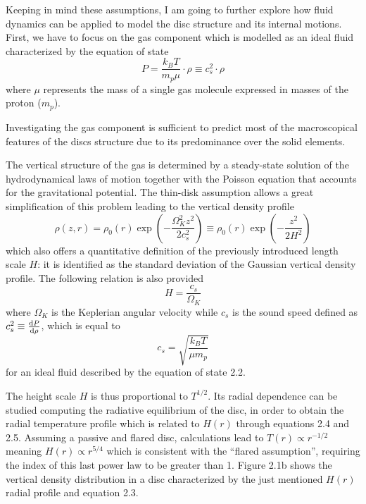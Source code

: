 \documentclass[a4paper,10pt]{report}
\begin{document}
Keeping in mind these assumptions, I am going to further explore how fluid dynamics can be applied to model the disc 
structure and its internal motions. First, we have to focus on the gas component which is modelled as an ideal fluid characterized
by the equation of state
\begin{equation}
    P = \frac{k_BT}{m_p\mu}\cdot \rho \equiv c_s^2 \cdot \rho
\end{equation}
where $\mu$ represents the mass of a single gas molecule expressed in masses of the proton ($m_p$).

Investigating the gas component is sufficient to predict most of the macroscopical features of the discs structure due to its
predominance over the solid elements. 

The vertical structure of the gas is determined by a steady-state solution of the hydrodynamical laws of motion together with the Poisson equation that
accounts for the gravitational potential. The thin-disk assumption allows a great simplification
 of this problem leading to the vertical density profile
\begin{equation}
    \rho(z, r) = \rho_0(r)\exp(-\frac{\Omega_K^2z^2}{2c_s^2}) \equiv \rho_0(r)\exp(-\frac{z^2}{2H^2})
\end{equation}
which also offers a quantitative definition of the previously introduced length scale
$H$: it is identified as the 
standard deviation of the Gaussian vertical density profile.
The following relation is also provided
\begin{equation}
    H = \frac{c_s}{\Omega_K}
\end{equation}
where $\Omega_K$ is the Keplerian 
angular velocity while $c_s$ is the sound speed defined as $c_s^2 \equiv \dv{P}{\rho}$, which is equal to 
\begin{equation}
    c_s = \sqrt{\frac{k_BT}{\mu m_p}}
\end{equation}
for an 
ideal fluid described by the equation of state 2.2.

The height scale $H$ is thus proportional to $T^{1/2}$. Its radial dependence
can be studied computing the radiative equilibrium of the disc, in order to obtain the 
radial temperature profile which is related to $H(r)$ through equations 2.4 and 2.5.
Assuming a passive and flared disc, calculations lead to $T(r) \propto r^{-1/2}$ 
meaning $H(r) \propto r^{5/4}$ which is consistent with the ``flared assumption'', requiring the index of this last
power law to be greater than 1.
Figure 2.1b shows the vertical density distribution in a disc characterized by the just mentioned $H(r)$ radial profile
and equation 2.3.
\end{document}
